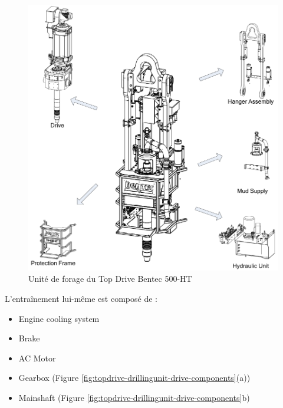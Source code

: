 \begin{figure}[H]
	\centering
	\includegraphics[width=.7\linewidth]{figures/topdrive_drillingunit.png}
	\caption{Unité de forage du Top Drive Bentec 500-HT}%
	\label{fig:topdrive-drillingunit}
\end{figure}

L'entraînement lui-même est composé de :

\begin{itemize}
	\item Engine cooling system
	\item Brake
	\item AC Motor
	\item Gearbox (Figure \ref{fig:topdrive-drillingunit-drive-components}(a))
	\item Mainshaft (Figure \ref{fig:topdrive-drillingunit-drive-components}b)
\end{itemize}

